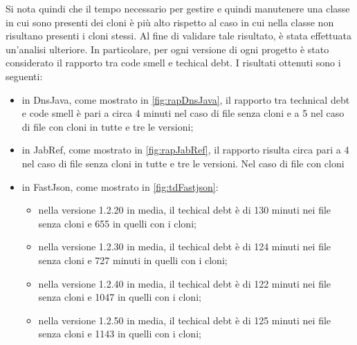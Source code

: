 Si nota quindi che il tempo necessario per gestire e quindi manutenere una classe in cui sono presenti dei cloni è più alto rispetto al caso in cui nella classe non risultano presenti i cloni stessi. Al fine di validare tale risultato, è stata effettuata un'analisi ulteriore. In particolare, per ogni versione di ogni progetto è stato considerato il rapporto tra code smell e techical debt. I risultati ottenuti sono i seguenti:
\begin{itemize}
	\item in DnsJava, come mostrato in \autoref{fig:rapDnsJava}, il rapporto tra technical debt e code smell è pari a circa 4 minuti nel caso di file senza cloni e a 5 nel caso di file con cloni in tutte e tre le versioni;
	\item in JabRef, come mostrato in \autoref{fig:rapJabRef}, il rapporto risulta circa pari a 4 nel caso di file senza cloni in tutte e tre le versioni. Nel caso di file con cloni
	\item in FastJson, come mostrato in \autoref{fig:tdFastjson}:
	\begin{itemize}
		\item nella versione 1.2.20 in media, il techical debt è di 130 minuti nei file senza cloni e 655 in quelli con i cloni;
		\item nella versione 1.2.30 in media, il techical debt è di 124 minuti nei file senza cloni e 727 minuti in quelli con i cloni;
		\item nella versione 1.2.40 in media, il techical debt è di 122 minuti nei file senza cloni e 1047 in quelli con i cloni;
		\item nella versione 1.2.50 in media, il techical debt è di 125 minuti nei file senza cloni e 1143 in quelli con i cloni;
	\end{itemize}
\end{itemize}


